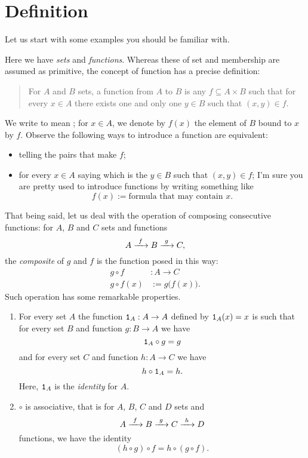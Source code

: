 
\section{Definition}

Let us start with some examples you should be familiar with.

\begin{example}
Here we have {\em sets} and {\em functions}. Whereas these of set and membership are assumed as primitive, the concept of function has a precise definition:
\begin{quotation}
For \(A\) and \(B\) sets, a function from \(A\) to \(B\) is any \(f \subseteq A \times B\) such that for every \(x \in A\) there exists one and only one \(y \in B\) such that \((x, y ) \in f\).
\end{quotation}
We write  to mean ; for \(x \in A\), we denote by \(f(x)\) the element of \(B\) bound to \(x\) by \(f\). Observe the following ways to introduce a function are equivalent:
\begin{itemize}
\item telling the pairs that make \(f\);
\item for every \(x \in A\) saying which is the \(y \in B\) such that \((x, y) \in f\); I'm sure you are pretty used to introduce functions by writing something like
\[f(x) := \text{formula that may contain } x .\]
\end{itemize}
That being said, let us deal with the operation of composing consecutive functions: for \(A\), \(B\) and \(C\) sets and functions
\[A \xrightarrow{\ f\ } B \xrightarrow{\ g\ } C ,\]
the {\em composite} of \(g\) and \(f\) is the function posed in this way:
\begin{align*}
g \circ f &: A \to C \\
g \circ f(x) &:= g\big(f(x)\big) .
\end{align*}
Such operation has some remarkable properties.
\begin{enumerate}
\item For every set \(A\) the function \(\mathtt 1_A : A \to A\) defined by \(\mathtt 1_A(x) = x\) is such that for every set \(B\) and function \(g : B \to A\) we have
\[\mathtt 1_A \circ g = g\]
and for every set \(C\) and function \(h : A \to C\) we have
\[h \circ \mathtt 1_A = h .\]
Here, \(\mathtt 1_A\) is the {\em identity} for \(A\).
\item \(\circ\) is associative, that is for \(A\), \(B\), \(C\) and \(D\) sets and
\[A \xrightarrow{\ f\ } B \xrightarrow{\ g\ } C \xrightarrow{\ h\ } D\]
functions, we have the identity
\[(h \circ g) \circ f = h \circ (g \circ f) .\]
\end{enumerate}
\end{example}

